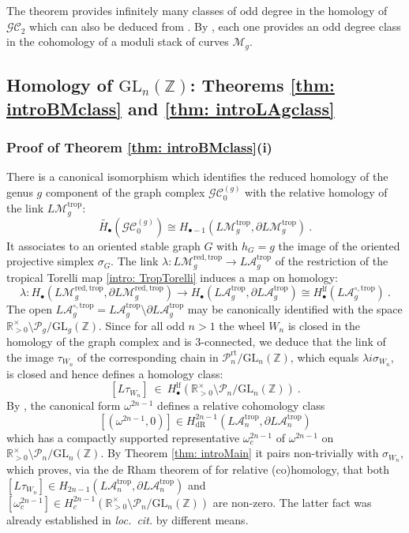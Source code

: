 \documentclass[10pt]{amsart}
\newcommand{\RR}{{\mathbb R}}
\newcommand{\ZZ}{{\mathbb Z}}
\theoremstyle{plain}
\newcommand{\LM}{L\mathcal{M}}
\newcommand{\LA}{L\mathcal{A}}
\newcommand{\GL}{\mathrm{GL}}
\newcommand{\trop}{\mathrm{trop}}
\newcommand{\To}{\longrightarrow}
\newcommand{\GC}{\mathcal{GC}}
\newcommand{\0}{\color{blue}{\mathsf{0}}}
\begin{document}
The theorem provides infinitely many classes of odd degree in the homology of  $\GC_2$ which can also be deduced from    \cite{SpectralSequenceGC2}. By \cite{CGP}, each one provides an odd degree class  in the cohomology of a moduli stack of curves $\mathcal{M}_g$. 
\subsection{Homology of \texorpdfstring{$\GL_n(\ZZ)$}{the general linear group}: Theorems \ref{thm: introBMclass} and \ref{thm: introLAgclass}}\pagebreak[4]

\subsubsection{Proof of Theorem  \texorpdfstring{\ref{thm: introBMclass}(i)}{.} }
There is a canonical isomorphism which identifies  the reduced homology of the genus $g$ component of the graph complex  $\GC^{(g)}_0$ with the relative homology of the link $\LM^{\trop}_g$: 
\[ \widetilde{H_{\bullet}} (\GC^{(g)}_0)   \cong  H_{\bullet-1} (\LM_g^{\trop}, \partial \LM_g^{\trop}  ) \ . \]
 It associates to an oriented stable graph $G$ with $h_G=g$ the image of the oriented projective simplex  $\sigma_G$. The link $ \lambda:  \LM_g^{\mathrm{red},\trop} \rightarrow  \LA_g^{\trop}$ of the  restriction of the tropical Torelli map \eqref{intro: TropTorelli} 
induces a map on homology:
\[ \lambda:  H_{\bullet} (\LM_g^{\mathrm{red},\trop}, \partial \LM_g^{\mathrm{red}, \trop}  ) \To   H_{\bullet} (\LA_g^{\trop}, \partial \LA_g^{\trop}  )   \cong H^{\mathrm{lf}}_{\bullet} (\LA_g^{\circ, \trop} )  \ . \]
The open $\LA_g^{\circ, \trop}=  \LA_g^{\trop}\setminus   \partial \LA_g^{\trop} $ may be canonically identified with the space $\RR^{\times}_{>0} \setminus \mathcal{P}_g /\GL_g(\ZZ)$. 
Since for all odd $n>1$ the  wheel $W_n$ is closed in the homology of the graph complex and is 3-connected, we deduce that the  link of the image $  \tau_{W_n}$ of the corresponding chain in $\mathcal{P}^{\mathrm{rt}}_n /\GL_n(\ZZ)$, which equals $ \lambda i \sigma_{W_n}$, is  closed and hence defines a homology class: 
\[   [ L  \tau_{W_n} ]   \  \in  \   H^{\mathrm{lf}}_{\bullet} (\RR^{\times}_{>0} \setminus \mathcal{P}_n /\GL_n(\ZZ))\ .  \]
 By  \cite{brown2023bordifications}, the  canonical form $\omega^{2n-1}$  defines a relative cohomology class
\[ [(\omega^{2n-1},0)] \in   H_{\mathrm{dR}}^{2n-1} \left(\LA_n^{\trop}, \partial \LA_n^{\trop} \right) \] 
which has  a compactly supported representative $\omega_c^{2n-1}$  of $\omega^{2n-1}$ on  $\RR^{\times}_{>0} \setminus \mathcal{P}_n /\GL_n(\ZZ)$. By Theorem \ref{thm: introMain}  it pairs non-trivially with $\sigma_{W_n}$, which proves, via the de Rham theorem of \cite{brown2023bordifications} for relative (co)homology, that  both $[L\tau_{W_n}] \in  H_{2n-1} (\LA_n^{\trop}, \partial \LA_n^{\trop}  ) $ and $[\omega_c^{2n-1}] \in H^{2n-1}_c(\RR^{\times}_{>0} \setminus \mathcal{P}_n /\GL_n(\ZZ))$ are non-zero. The latter fact was already established in \emph{loc.\ cit.} by different means. 
\end{document}
